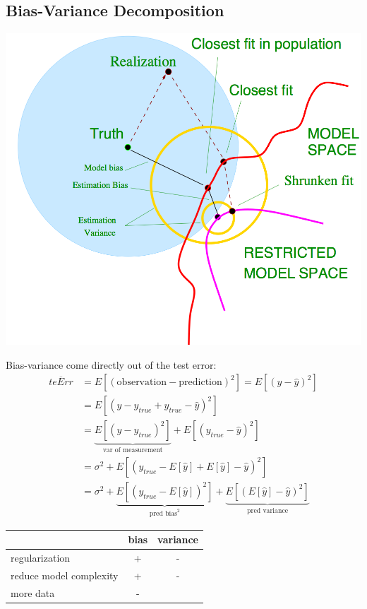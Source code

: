 \documentclass[10pt,a4paper,landscape]{article}
\begin{document}
\begin{multicols*}{4}
\subsection{Bias-Variance Decomposition}
\begin{colfig}
  \centering
  \includegraphics[width=\linewidth]{images/bias-variance.png}
\end{colfig}

Bias-variance come directly out of the test error:
 \begin{align*}
 \overline{teErr}
 &= E[(\text{observation} - \text{prediction})^2] = E[(y - \hat{y})^2] \\
 &= E[(y - y_{true} + y_{true} - \hat{y})^2] \\
 &=\underbrace{E[(y - y_{true})^2]}_{\text{var of measurement}} + E[(y_{true} - \hat{y})^2] \\
 &=\sigma^2 + E[(y_{true} - E[\hat{y}] + E[\hat{y}] - \hat{y})^2] \\
 &=\sigma^2 + \underbrace{E[(y_{true} - E[\hat{y}])^2]}_{\text{pred bias}^2} +\underbrace{E[(E[\hat{y}] - \hat{y})^2]}_{\text{pred variance}}
\end{align*}

\begin{tabular}{ l || c | c }
                          & bias & variance \\
  \hline
  regularization          & +    & - \\
  reduce model complexity & +    & - \\
  more data               & -    & \\
  \hline
\end{tabular}


\end{multicols*}
\end{document}
